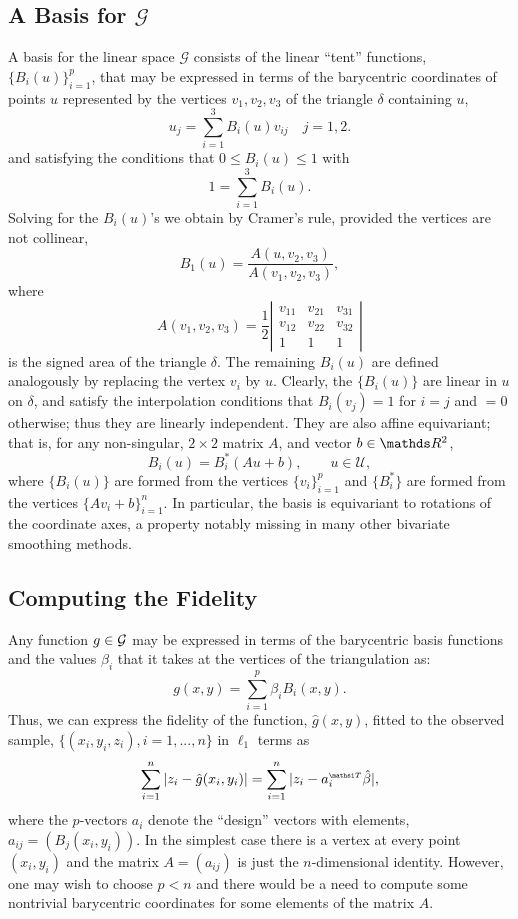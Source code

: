 \subsection{A Basis for ${\mathcal G}$}
A basis for the linear space ${\mathcal G}$ consists of the linear ``tent''
functions, $\{B_i(u)\}_{i=1}^p$, that may be expressed  
in terms of the barycentric coordinates of points $u$
represented by the vertices $v_1, v_2, v_3$ of the triangle $\delta$
containing $u$,
$$
u_j=\sum_{i=1}^3 B_i(u) v_{ij} \quad j=1,2.
$$
and satisfying the conditions that $0\leq B_i(u) \leq 1$ with
$$
1=\sum_{i=1}^3 B_i(u).
$$
Solving for the $B_i(u)$'s we obtain by Cramer's rule, provided the
vertices are not collinear,
$$
B_1(u) = \frac{A  (u, v_2, v_3)}{A  (v_1, v_2, v_3)},
$$
where
$$
A  (v_1, v_2, v_3) = \frac{1}{2} \left| \begin{array}{ccc}
v_{11} & v_{21} & v_{31} \\
v_{12} & v_{22} & v_{32} \\
1 & 1 & 1 \end{array} \right|
$$
is the signed area of the triangle $\delta$. The remaining $B_i(u)$
are defined analogously by replacing the vertex $v_i$ by $u$. Clearly,
the $\{B_i(u)\}$ are linear in $u$ on $\delta$, and satisfy the
interpolation conditions that $B_i(v_j) = 1$ for $i=j$ and $=0$
otherwise; thus they are linearly independent. They are also affine
equivariant; that is, for any non-singular, $2 \times 2$ matrix $A$,
and vector $b\in \RR^2$,
$$
B_i(u) = B_i^*(Au+b), \qquad u\in {\mathcal U},
$$
where $\{B_i(u)\}$ are formed from the vertices $\{v_i\}_{i=1}^p$ and
$\{B_i^*\}$ are formed from the vertices $\{A v_i+b\}_{i=1}^n$. In
particular, the basis is equivariant to rotations of the coordinate
axes, a property notably missing in many other bivariate smoothing
methods. 

\subsection{Computing the Fidelity}
Any function $g \in \mathcal{G}$ may be expressed in
terms of the barycentric basis functions and the values $\beta_i$
that it takes at the vertices of the triangulation as:
\[
g(x,y) = \sum_{i=1}^p \beta_i B_i (x,y).
\]
Thus, we can express the fidelity of the function, $\hat g (x,y)$, fitted to
the observed sample, $\{ ( x_i, y_i, z_i ), i=1,...,n \}$ in $\ell_1$
terms as
\[
\sum_{i=1}^n |z_i - \hat g (x_i, y_i ) | = \sum_{i=1}^n
|z_i - a_i \trans \hat \beta |, 
\]
where the $p$-vectors $a_i$ denote the ``design'' vectors with
elements, $a_{ij} = (B_j (x_i,y_i))$.  In the simplest case
there is a vertex at every point $(x_i , y_i)$
and the matrix $A = (a_{ij})$ is just the $n$-dimensional identity.
However, one may wish to choose $p < n$ and there would be
a need to compute some nontrivial barycentric coordinates for some elements of
the matrix $A$.


